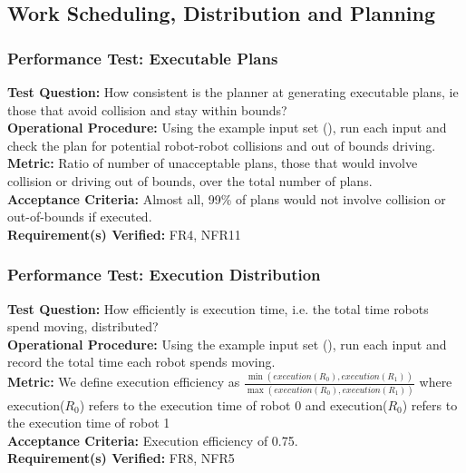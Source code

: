 
\subsection{Work Scheduling, Distribution and Planning}
\label{sec:verification_sdp}

\subsubsection{Performance Test: Executable Plans}
\label{test:sdp_pt_executable}
\textbf{Test Question:} How consistent is the planner at generating executable plans, ie those that avoid collision and stay within bounds? \\
\textbf{Operational Procedure:} Using the example input set (), run each input and check the plan for potential robot-robot collisions and out of bounds driving. \\
\textbf{Metric:} Ratio of number of unacceptable plans, those that would involve collision or driving out of bounds, over the total number of plans. \\
\textbf{Acceptance Criteria:} Almost all, 99\% of plans would not involve collision or out-of-bounds if executed. \\
\textbf{Requirement(s) Verified:} FR4, NFR11 \\

\subsubsection{Performance Test: Execution Distribution}
\label{test:sdp_pt_execu}
\textbf{Test Question:} How efficiently is execution time, i.e. the total time robots spend moving, distributed?\\
\textbf{Operational Procedure:} Using the example input set (), run each input and record the total time each robot spends moving. \\
\textbf{Metric:} We define execution efficiency as $\frac{\min(execution(R_{0}), execution(R_{1}))}{\max(execution(R_{0}), execution(R_{1}))}$ where execution($R_{0}$) refers to the execution time of robot 0 and execution($R_{0}$) refers to the execution time of robot 1\\
\textbf{Acceptance Criteria:} Execution efficiency of 0.75.\\
\textbf{Requirement(s) Verified:} FR8, NFR5 \\

